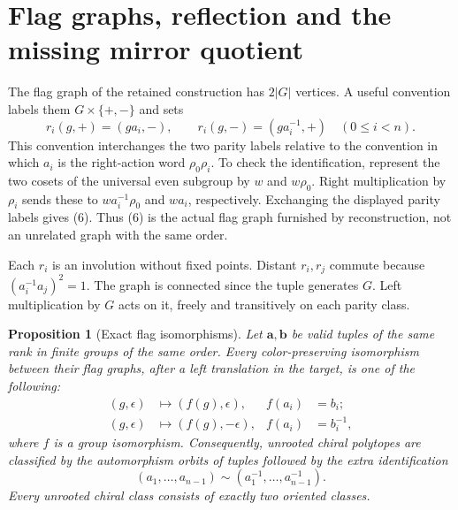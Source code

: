 \documentclass[11pt]{article}
\newtheorem{proposition}[theorem]{Proposition}
\theoremstyle{remark}\newtheorem{remark}[theorem]{Remark}
\begin{document}
\section{Flag graphs, reflection and the missing mirror quotient}

The flag graph of the retained construction has $2|G|$ vertices. A useful convention labels them $G\times\{+,-\}$ and sets
\[
 r_i(g,+)=(ga_i,-),\qquad r_i(g,-)=(ga_i^{-1},+)
 \quad(0\leq i<n).
\tag{6}
\]
This convention interchanges the two parity labels relative to the convention in which $a_i$ is the right-action word $\rho_0\rho_i$. To check the identification, represent the two cosets of the universal even subgroup by $w$ and $w\rho_0$. Right multiplication by $\rho_i$ sends these to
$w a_i^{-1}\rho_0$ and $w a_i$, respectively. Exchanging the displayed parity labels gives (6). Thus (6) is the actual flag graph furnished by reconstruction, not an unrelated graph with the same order.

Each $r_i$ is an involution without fixed points. Distant $r_i,r_j$ commute because $(a_i^{-1}a_j)^2=1$. The graph is connected since the tuple generates $G$. Left multiplication by $G$ acts on it, freely and transitively on each parity class.

\begin{proposition}[Exact flag isomorphisms]
Let $\boldsymbol a,\boldsymbol b$ be valid tuples of the same rank in finite groups of the same order. Every color-preserving isomorphism between their flag graphs, after a left translation in the target, is one of the following:
\begin{align*}
 (g,\epsilon)&\longmapsto(f(g),\epsilon),
 & f(a_i)&=b_i;\\
 (g,\epsilon)&\longmapsto(f(g),-\epsilon),
 & f(a_i)&=b_i^{-1},
\end{align*}
where $f$ is a group isomorphism. Consequently, unrooted chiral polytopes are classified by the automorphism orbits of tuples followed by the extra identification
\[
 (a_1,\ldots,a_{n-1})\sim(a_1^{-1},\ldots,a_{n-1}^{-1}).
 \tag{7}
\]
Every unrooted chiral class consists of exactly two oriented classes.
\end{proposition}
\end{document}

